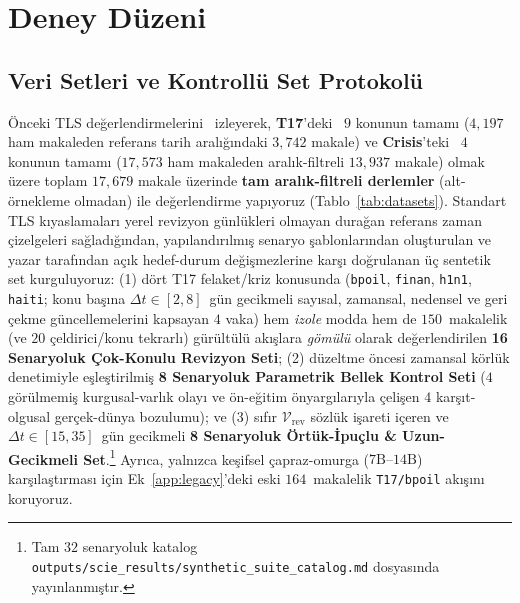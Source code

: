 ﻿\documentclass[journal]{IEEEtran}
\begin{document}
\section{Deney D\"{u}zeni}
\label{sec:experiments}

\subsection{Veri Setleri ve Kontroll\"{u} Set Protokol\"{u}}
\label{subsec:datasets}

\"{O}nceki TLS de\u{g}erlendirmelerini~\cite{hu2024moments, wu2025unfolding} izleyerek, \textbf{T17}'deki~\cite{tran2013leveraging} $9$ konunun tamam{\i} ($4{,}197$ ham makaleden referans tarih aral{\i}\u{g}{\i}ndaki $3{,}742$ makale) ve \textbf{Crisis}'teki~\cite{tran2015timeline} $4$ konunun tamam{\i} ($17{,}573$ ham makaleden aral{\i}k-filtreli $13{,}937$ makale) olmak \"{u}zere toplam $17{,}679$ makale \"{u}zerinde \textbf{tam aral{\i}k-filtreli derlemler} (alt-\"{o}rnekleme olmadan) ile de\u{g}erlendirme yap{\i}yoruz (Tablo~\ref{tab:datasets}). Standart TLS k{\i}yaslamalar{\i} yerel revizyon g\"{u}nl\"{u}kleri olmayan dura\u{g}an referans zaman \c{c}izelgeleri sa\u{g}lad{\i}\u{g}{\i}ndan, yap{\i}land{\i}r{\i}lm{\i}\c{s} senaryo \c{s}ablonlar{\i}ndan olu\c{s}turulan ve yazar taraf{\i}ndan a\c{c}{\i}k hedef-durum de\u{g}i\c{s}mezlerine kar\c{s}{\i} do\u{g}rulanan \"{u}\c{c} sentetik set kurguluyoruz: (1) d\"{o}rt T17 felaket/kriz konusunda (\texttt{bpoil}, \texttt{finan}, \texttt{h1n1}, \texttt{haiti}; konu ba\c{s}{\i}na $\Delta t \in [2, 8]$~g\"{u}n gecikmeli say{\i}sal, zamansal, nedensel ve geri \c{c}ekme g\"{u}ncellemelerini kapsayan $4$ vaka) hem \textit{izole} modda hem de $150$~makalelik (ve $20$ \c{c}eldirici/konu tekrarl{\i}) g\"{u}r\"{u}lt\"{u}l\"{u} ak{\i}\c{s}lara \textit{g\"{o}m\"{u}l\"{u}} olarak de\u{g}erlendirilen \textbf{16 Senaryoluk \c{C}ok-Konulu Revizyon Seti}; (2) d\"{u}zeltme \"{o}ncesi zamansal k\"{o}rl\"{u}k denetimiyle e\c{s}le\c{s}tirilmi\c{s} \textbf{8 Senaryoluk Parametrik Bellek Kontrol Seti} ($4$ g\"{o}r\"{u}lmemi\c{s} kurgusal-varl{\i}k olay{\i} ve \"{o}n-e\u{g}itim \"{o}nyarg{\i}lar{\i}yla \c{c}eli\c{s}en $4$ kar\c{s}{\i}t-olgusal ger\c{c}ek-d\"{u}nya bozulumu); ve (3) s{\i}f{\i}r $\mathcal{V}_{\text{rev}}$ s\"{o}zl\"{u}k i\c{s}areti i\c{c}eren ve $\Delta t \in [15, 35]$~g\"{u}n gecikmeli \textbf{8 Senaryoluk \"{O}rt\"{u}k-\.{I}pu\c{c}lu \& Uzun-Gecikmeli Set}.\footnote{Tam $32$ senaryoluk katalog \texttt{outputs/scie\_results/synthetic\_suite\_catalog.md} dosyas{\i}nda yay{\i}nlanm{\i}\c{s}t{\i}r.} Ayr{\i}ca, yaln{\i}zca ke\c{s}ifsel \c{c}apraz-omurga ($7\text{B}\text{--}14\text{B}$) kar\c{s}{\i}la\c{s}t{\i}rmas{\i} i\c{c}in Ek~\ref{app:legacy}'deki eski $164$~makalelik \texttt{T17/bpoil} ak{\i}\c{s}{\i}n{\i} koruyoruz.
\end{document}
